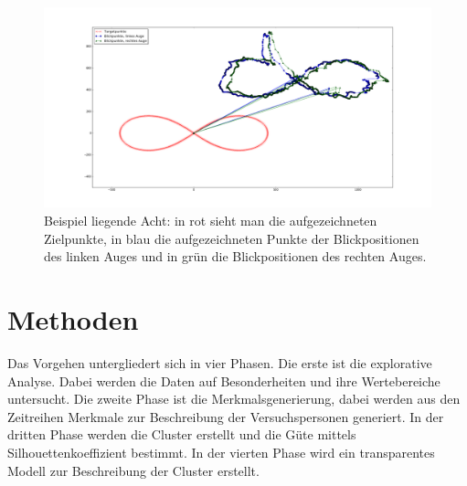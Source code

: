 \documentclass[12pt]{article}
\begin{document}
\begin{figure}[h]
	\noindent \begin{centering}
		\includegraphics[width=17cm]{Bilder/bspRohdaten.png}
		\par\end{centering}
	\caption{\label{fig:rohdaten}Beispiel liegende Acht: in rot sieht man die aufgezeichneten Zielpunkte, in blau die aufgezeichneten Punkte der Blickpositionen des linken Auges und in gr\"un die Blickpositionen des rechten Auges.}
\end{figure}

\section*{Methoden}
Das Vorgehen untergliedert sich in vier Phasen. Die erste ist die explorative Analyse. Dabei werden die Daten auf Besonderheiten und ihre Wertebereiche untersucht. Die zweite Phase ist die Merkmalsgenerierung, dabei werden aus den Zeitreihen Merkmale zur Beschreibung der Versuchspersonen generiert. In der dritten Phase werden die Cluster erstellt und die G\"ute mittels Silhouettenkoeffizient bestimmt. In der vierten Phase wird ein transparentes Modell zur Beschreibung der Cluster erstellt.




\end{document}
